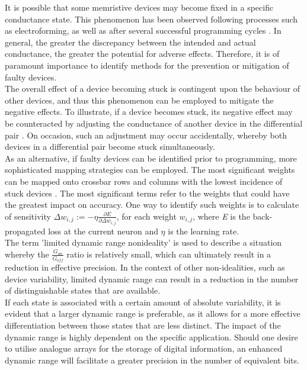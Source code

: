 \noindent It is possible that some memristive devices may become fixed in a specific conductance state. This phenomenon has been observed following processes such as electroforming, as well as after several successful programming cycles \cite{joksas2022nonideality}. In general, the greater the discrepancy between the intended and actual conductance, the greater the potential for adverse effects. Therefore, it is of paramount importance to identify methods for the prevention or mitigation of faulty devices.\\

\noindent The overall effect of a device becoming stuck is contingent upon the behaviour of other devices, and thus this phenomenon can be employed to mitigate the negative effects. To illustrate, if a device becomes stuck, its negative effect may be counteracted by adjusting the conductance of another device in the differential pair \cite{liu2017rescuing}. On occasion, such an adjustment may occur accidentally, whereby both devices in a differential pair become stuck simultaneously.\\

\noindent As an alternative, if faulty devices can be identified prior to programming, more sophisticated mapping strategies can be employed. The most significant weights can be mapped onto crossbar rows and columns with the lowest incidence of stuck devices \cite{gaol2021reliable}. The most significant terms refer to the weights that could have the greatest impact on accuracy. One way to identify such weights is to calculate of sensitivity $\Delta w_{i,j} := - \eta \frac{\partial E}{\partial \Delta w_{i,j}}$, for each weight $w_{i,j}$, where \textit{E} is the back-propagated loss at the current neuron and $\eta$ is the learning rate.\\

\noindent The term 'limited dynamic range nonideality' is used to describe a situation whereby the $\frac{G_{on}}{G_{off}}$ ratio is relatively small, which can ultimately result in a reduction in effective precision. In the context of other non-idealities, such as device variability, limited dynamic range can result in a reduction in the number of distinguishable states that are available. \\

\noindent If each state is associated with a certain amount of absolute variability, it is evident that a larger dynamic range is preferable, as it allows for a more effective differentiation between those states that are less distinct. The impact of the dynamic range is highly dependent on the specific application. Should one desire to utilise analogue arrays for the storage of digital information, an enhanced dynamic range will facilitate a greater precision in the number of equivalent bits.\\

